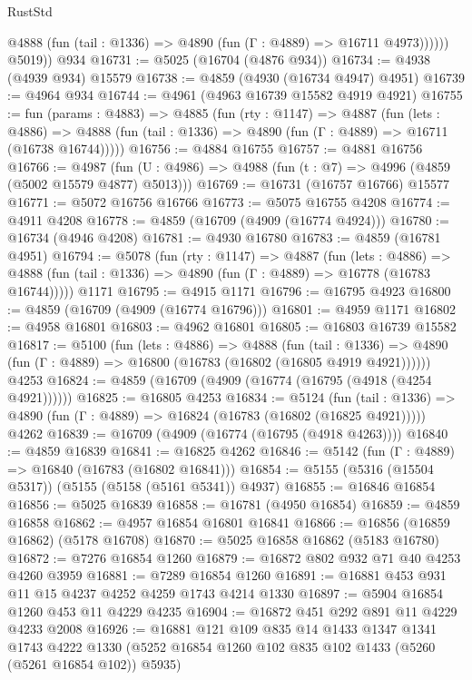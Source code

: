 \begin{lexlean}{RustStd}
\begin{coremodule}
              @4888 (fun (tail : @1336) => @4890 (fun (Γ : @4889) => @16711 @4973))))))
        @5019))
    @934
@16731 := @5025 (@16704 (@4876 @934))
@16734 := @4938 (@4939 @934) @15579
@16738 := @4859 (@4930 (@16734 @4947) @4951)
@16739 := @4964 @934
@16744 := @4961 (@4963 @16739 @15582 @4919 @4921)
@16755 := fun (params : @4883) =>
  @4885
    (fun (rty : @1147) =>
    @4887
      (fun (lets : @4886) =>
      @4888 (fun (tail : @1336) => @4890 (fun (Γ : @4889) => @16711 (@16738 @16744)))))
@16756 := @4884 @16755
@16757 := @4881 @16756
@16766 := @4987
    (fun (U : @4986) => @4988 (fun (t : @7) => @4996 (@4859 (@5002 @15579 @4877) @5013)))
@16769 := @16731 (@16757 @16766) @15577
@16771 := @5072 @16756 @16766
@16773 := @5075 @16755 @4208
@16774 := @4911 @4208
@16778 := @4859 (@16709 (@4909 (@16774 @4924)))
@16780 := @16734 (@4946 @4208)
@16781 := @4930 @16780
@16783 := @4859 (@16781 @4951)
@16794 := @5078
    (fun (rty : @1147) =>
    @4887
      (fun (lets : @4886) =>
      @4888 (fun (tail : @1336) => @4890 (fun (Γ : @4889) => @16778 (@16783 @16744)))))
    @1171
@16795 := @4915 @1171
@16796 := @16795 @4923
@16800 := @4859 (@16709 (@4909 (@16774 @16796)))
@16801 := @4959 @1171
@16802 := @4958 @16801
@16803 := @4962 @16801
@16805 := @16803 @16739 @15582
@16817 := @5100
    (fun (lets : @4886) =>
    @4888
      (fun (tail : @1336) =>
      @4890 (fun (Γ : @4889) => @16800 (@16783 (@16802 (@16805 @4919 @4921))))))
    @4253
@16824 := @4859 (@16709 (@4909 (@16774 (@16795 (@4918 (@4254 @4921))))))
@16825 := @16805 @4253
@16834 := @5124
    (fun (tail : @1336) => @4890 (fun (Γ : @4889) => @16824 (@16783 (@16802 (@16825 @4921)))))
    @4262
@16839 := @16709 (@4909 (@16774 (@16795 (@4918 @4263))))
@16840 := @4859 @16839
@16841 := @16825 @4262
@16846 := @5142 (fun (Γ : @4889) => @16840 (@16783 (@16802 @16841)))
@16854 := @5155 (@5316 (@15504 @5317)) (@5155 (@5158 (@5161 @5341)) @4937)
@16855 := @16846 @16854
@16856 := @5025 @16839
@16858 := @16781 (@4950 @16854)
@16859 := @4859 @16858
@16862 := @4957 @16854 @16801 @16841
@16866 := @16856 (@16859 @16862) (@5178 @16708)
@16870 := @5025 @16858 @16862 (@5183 @16780)
@16872 := @7276 @16854 @1260
@16879 := @16872 @802 @932 @71 @40 @4253 @4260 @3959
@16881 := @7289 @16854 @1260
@16891 := @16881 @453 @931 @11 @15 @4237 @4252 @4259 @1743 @4214 @1330
@16897 := @5904 @16854 @1260 @453 @11 @4229 @4235
@16904 := @16872 @451 @292 @891 @11 @4229 @4233 @2008
@16926 := @16881
    @121
    @109
    @835
    @14
    @1433
    @1347
    @1341
    @1743
    @4222
    @1330
    (@5252 @16854 @1260 @102 @835 @102 @1433 (@5260 (@5261 @16854 @102)) @5935)

\end{coremodule}
\end{lexlean}
